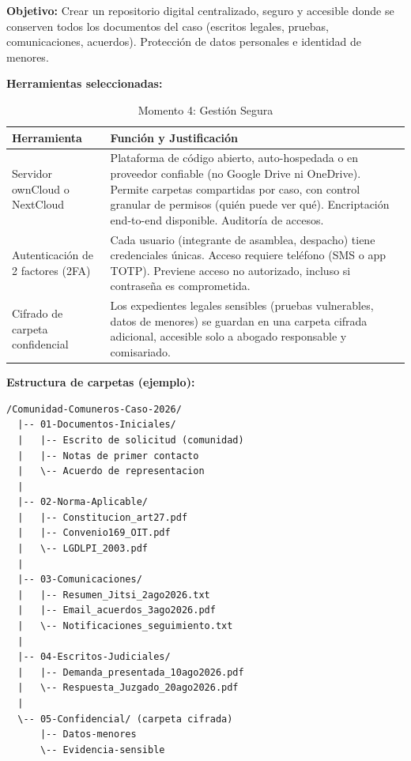 ﻿\documentclass[
  spanish,
  letterpaper, oneside
]{article}
\begin{document}
\textbf{Objetivo:} Crear un repositorio digital centralizado, seguro y accesible donde se 
conserven todos los documentos del caso (escritos legales, pruebas, comunicaciones, acuerdos). 
Protección de datos personales e identidad de menores.

\textbf{Herramientas seleccionadas:}

\begin{table}[h]
\centering
\small
\begin{tabular}{@{}lp{8cm}@{}}
\toprule
\textbf{Herramienta} & \textbf{Función y Justificación} \\
\midrule
Servidor ownCloud o NextCloud & Plataforma de código abierto, auto-hospedada o en proveedor 
confiable (no Google Drive ni OneDrive). Permite carpetas compartidas por caso, con control 
granular de permisos (quién puede ver qué). Encriptación end-to-end disponible. Auditoría de 
accesos. \\
\midrule
Autenticación de 2 factores (2FA) & Cada usuario (integrante de asamblea, despacho) 
tiene credenciales únicas. Acceso requiere teléfono (SMS o app TOTP). Previene acceso 
no autorizado, incluso si contraseña es comprometida. \\
\midrule
Cifrado de carpeta confidencial & Los expedientes legales sensibles (pruebas vulnerables, 
datos de menores) se guardan en una carpeta cifrada adicional, accesible solo a abogado 
responsable y comisariado. \\
\bottomrule
\end{tabular}
\caption{Momento 4: Gestión Segura}
\label{tab:momento4}
\end{table}

\textbf{Estructura de carpetas (ejemplo):}

\begin{verbatim}
/Comunidad-Comuneros-Caso-2026/
  |-- 01-Documentos-Iniciales/
  |   |-- Escrito de solicitud (comunidad)
  |   |-- Notas de primer contacto
  |   \-- Acuerdo de representacion
  |
  |-- 02-Norma-Aplicable/
  |   |-- Constitucion_art27.pdf
  |   |-- Convenio169_OIT.pdf
  |   \-- LGDLPI_2003.pdf
  |
  |-- 03-Comunicaciones/
  |   |-- Resumen_Jitsi_2ago2026.txt
  |   |-- Email_acuerdos_3ago2026.pdf
  |   \-- Notificaciones_seguimiento.txt
  |
  |-- 04-Escritos-Judiciales/
  |   |-- Demanda_presentada_10ago2026.pdf
  |   \-- Respuesta_Juzgado_20ago2026.pdf
  |
  \-- 05-Confidencial/ (carpeta cifrada)
      |-- Datos-menores
      \-- Evidencia-sensible
\end{verbatim}
\end{document}
